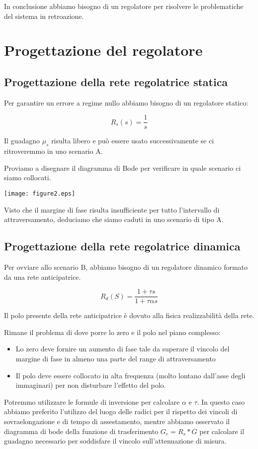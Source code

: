 \documentclass{article}
\begin{document}
In conclusione abbiamo bisogno di un regolatore per risolvere le problematiche del sistema in retroazione.

\section{Progettazione del regolatore}

\subsection{Progettazione della rete regolatrice statica}

Per garantire un errore a regime nullo abbiamo bisogno di un regolatore statico:

$$
R_s(s)=\frac{1}{s}
$$

Il guadagno $\mu_s$ risulta libero e può essere usato successivamente se ci ritroveremmo in uno scenario A.

Proviamo a disegnare il diagramma di Bode per verificare in quale scenario ci siamo collocati.

\begin{center}
    \texttt{[image: figure2.eps]}
\end{center}

Visto che il margine di fase risulta insufficiente per tutto l'intervallo di attraversamento, deduciamo che siamo caduti in uno scenario di tipo A.

\subsection{Progettazione della rete regolatrice dinamica}

Per ovviare allo scenario B, abbiamo bisogno di un regolatore dinamico formato da una rete anticipatrice.

$$
R_d(S)=\frac{1+\tau s}{1+\tau \alpha s}
$$

Il polo presente della rete anticipatrice è dovuto alla fisica realizzabilità della rete.

Rimane il problema di dove porre lo zero e il polo nel piano complesso:
\begin{itemize}
    \item Lo zero deve fornire un aumento di fase tale da superare il vincolo del margine di fase in almeno una parte del range di attraversamento
    \item Il polo deve essere collocato in alta frequenza (molto lontano dall'asse degli immaginari) per non disturbare l'effetto del polo.
\end{itemize}

Potremmo utilizzare le formule di inversione per calcolare $\alpha$ e $\tau$. In questo caso abbiamo preferito l'utilizzo del luogo delle radici per il rispetto dei vincoli di sovraelongazione e di tempo di assestamento, mentre abbiamo osservato il diagramma di bode della funzione di trasferimento $G_e = R_s * G$ per calcolare il guadagno necessario per soddisfare il vincolo sull'attenuazione di misura.
\end{document}
